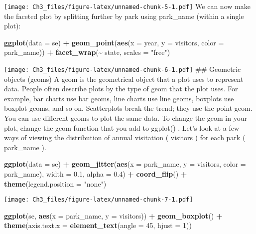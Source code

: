 \documentclass[
]{article}
\newenvironment{Shaded}{\begin{snugshade}}{\end{snugshade}}
\newcommand{\AttributeTok}[1]{\textcolor[rgb]{0.13,0.29,0.53}{#1}}
\newcommand{\DecValTok}[1]{\textcolor[rgb]{0.00,0.00,0.81}{#1}}
\newcommand{\FloatTok}[1]{\textcolor[rgb]{0.00,0.00,0.81}{#1}}
\newcommand{\FunctionTok}[1]{\textcolor[rgb]{0.13,0.29,0.53}{\textbf{#1}}}
\newcommand{\NormalTok}[1]{#1}
\newcommand{\SpecialCharTok}[1]{\textcolor[rgb]{0.81,0.36,0.00}{\textbf{#1}}}
\newcommand{\StringTok}[1]{\textcolor[rgb]{0.31,0.60,0.02}{#1}}
\begin{document}
\texttt{[image: Ch3\_files/figure-latex/unnamed-chunk-5-1.pdf]} We can
now make the faceted plot by splitting further by park using park\_name
(within a single plot):

\begin{Shaded}
\begin{Highlighting}[]
\FunctionTok{ggplot}\NormalTok{(}\AttributeTok{data =}\NormalTok{ se) }\SpecialCharTok{+}
\FunctionTok{geom\_point}\NormalTok{(}\FunctionTok{aes}\NormalTok{(}\AttributeTok{x =}\NormalTok{ year, }\AttributeTok{y =}\NormalTok{ visitors, }\AttributeTok{color =}\NormalTok{ park\_name)) }\SpecialCharTok{+}
\FunctionTok{facet\_wrap}\NormalTok{(}\SpecialCharTok{\textasciitilde{}}\NormalTok{ state, }\AttributeTok{scales =} \StringTok{"free"}\NormalTok{)}
\end{Highlighting}
\end{Shaded}

\texttt{[image: Ch3\_files/figure-latex/unnamed-chunk-6-1.pdf]} \#\#
Geometric objects (geoms) A geom is the geometrical object that a plot
uses to represent data. People often describe plots by the type of geom
that the plot uses. For example, bar charts use bar geoms, line charts
use line geoms, boxplots use boxplot geoms, and so on. Scatterplots
break the trend; they use the point geom. You can use different geoms to
plot the same data. To change the geom in your plot, change the geom
function that you add to ggplot() . Let's look at a few ways of viewing
the distribution of annual visitation ( visitors ) for each park (
park\_name ).

\begin{Shaded}
\begin{Highlighting}[]
\FunctionTok{ggplot}\NormalTok{(}\AttributeTok{data =}\NormalTok{ se) }\SpecialCharTok{+} 
\FunctionTok{geom\_jitter}\NormalTok{(}\FunctionTok{aes}\NormalTok{(}\AttributeTok{x =}\NormalTok{ park\_name, }\AttributeTok{y =}\NormalTok{ visitors, }\AttributeTok{color =}\NormalTok{ park\_name), }
\AttributeTok{width =} \FloatTok{0.1}\NormalTok{, }
\AttributeTok{alpha =} \FloatTok{0.4}\NormalTok{) }\SpecialCharTok{+}
 \FunctionTok{coord\_flip}\NormalTok{() }\SpecialCharTok{+}
 \FunctionTok{theme}\NormalTok{(}\AttributeTok{legend.position =} \StringTok{"none"}\NormalTok{)}
\end{Highlighting}
\end{Shaded}

\texttt{[image: Ch3\_files/figure-latex/unnamed-chunk-7-1.pdf]}

\begin{Shaded}
\begin{Highlighting}[]
\FunctionTok{ggplot}\NormalTok{(se, }\FunctionTok{aes}\NormalTok{(}\AttributeTok{x =}\NormalTok{ park\_name, }\AttributeTok{y =}\NormalTok{ visitors)) }\SpecialCharTok{+}
\FunctionTok{geom\_boxplot}\NormalTok{() }\SpecialCharTok{+}
\FunctionTok{theme}\NormalTok{(}\AttributeTok{axis.text.x =} \FunctionTok{element\_text}\NormalTok{(}\AttributeTok{angle =} \DecValTok{45}\NormalTok{, }\AttributeTok{hjust =} \DecValTok{1}\NormalTok{))}
\end{Highlighting}
\end{Shaded}
\end{document}
